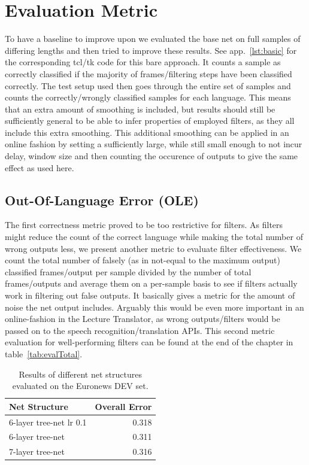 \section{Evaluation Metric}
\label{sec:eval:bare}

To have a baseline to improve upon we evaluated the base net on full samples of differing lengths and then tried to improve these results. See app.~\ref{lst:basic} for the corresponding tcl/tk code for this bare approach. It counts a sample as correctly classified if the majority of frames/filtering steps have been classified correctly. The test setup used then goes through the entire set of samples and counts the correctly/wrongly classified samples for each language. This means that an extra amount of smoothing is included, but results should still be sufficiently general to be able to infer properties of employed filters, as they all include this extra smoothing.  This additional smoothing can be applied in an online fashion by setting a sufficiently large, while still small enough to not incur delay, window size and then counting the occurence of outputs to give the same effect as used here. 

\subsection{Out-Of-Language Error (OLE)}
\label{sec:eval:ole}

The first correctness metric proved to be too restrictive for filters. As filters might reduce the count of the correct language while making the total number of wrong outputs less, we present another metric to evaluate filter effectiveness. We count the total number of falsely (as in not-equal to the maximum output) classified frames/output per sample divided by the number of total frames/outputs and average them on a per-sample basis to see if filters actually work in filtering out false outputs. It basically gives a metric for the amount of noise the net output includes. Arguably this would be even more important in an online-fashion in the Lecture Translator, as wrong outputs/filters would be passed on to the speech recognition/translation APIs. This second metric evaluation for well-performing filters can be found at the end of the chapter in table~\ref{tab:evalTotal}.

\begin{table}[h!]
\centering
\caption{Results of different net structures evaluated on the Euronews DEV set.}
\label{tab:evalNS}
\begin{tabular}{| l | r |}
	\hline
	\textbf{Net Structure} & \textbf{Overall Error}  \\
	\hline
	6-layer tree-net lr 0.1 & 0.318 \\
	\hline
	6-layer tree-net  &  0.311 \\
	\hline
	7-layer tree-net & 0.316 \\
	\hline
\end{tabular}
\end{table}

